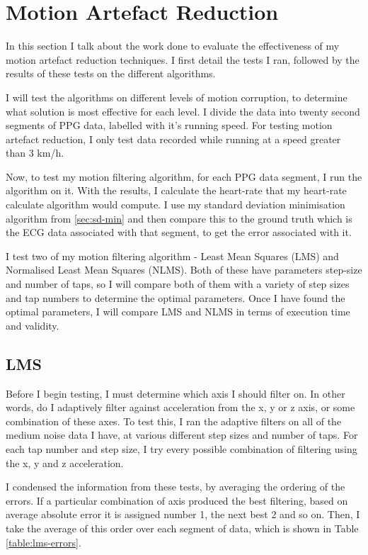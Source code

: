 \documentclass[12pt,a4paper,twoside,openright]{report}
\begin{document}
\section{Motion Artefact Reduction}

In this section I talk about the work done to evaluate the effectiveness of my
motion artefact reduction techniques. 
I first detail the tests I
ran, followed by the results of these tests on the different algorithms.

I will test the algorithms on different levels of motion corruption, to
determine what solution is most effective for each level. I divide the
data into twenty second segments of PPG data, labelled with it's running speed. For
testing motion artefact reduction, I only test data recorded while running at
a speed greater than 3 km/h.

Now, to test my motion filtering algorithm, for each PPG data segment, I run
the algorithm on it. With the results, I calculate the heart-rate that my
heart-rate calculate algorithm would compute. 
I use my standard deviation minimisation algorithm from \ref{sec:sd-min}
and then compare this to the
ground truth which is the ECG data associated with that segment, to get the
error associated with it.

I test two of my motion filtering algorithm - Least Mean Squares (LMS) and Normalised Least Mean
Squares (NLMS). Both of these have parameters step-size and number of taps, so I will
compare both of them with a variety of step sizes and tap numbers to determine
the optimal parameters. Once I have found the optimal parameters, I will
compare LMS and NLMS in terms of execution time and validity.

\subsection{LMS}

Before I begin testing, I must determine which axis I should filter on. In
other words, do I adaptively filter against acceleration from the x, y or z
axis, or some combination of these axes. To test this, I ran the adaptive
filters on all of the medium noise data I have, at various different step sizes
and number of taps. For each tap number and step size, I try every possible
combination of filtering using the x, y and z acceleration. 

I condensed the information from these tests, by averaging the ordering of
the errors. If a particular combination of axis produced the best filtering,
based on average absolute error 
it is assigned number 1, the next best 2 and so on. Then, I take the average
of this order over each segment of data, which is shown in Table \ref{table:lms-errors}.
\end{document}
